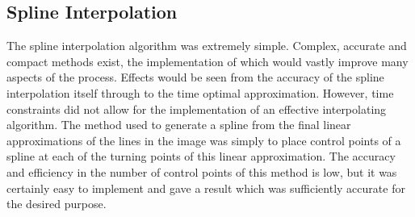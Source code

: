 \subsection{Spline Interpolation}
The spline interpolation algorithm was extremely simple. Complex, accurate and compact methods exist, the implementation of which would vastly improve many aspects of the process. Effects would be seen from the accuracy of the spline interpolation itself through to the time optimal approximation. However, time constraints did not allow for the implementation of an effective interpolating algorithm. The method used to generate a spline from the final linear approximations of the lines in the image was simply to place control points of a spline at each of the turning points of this linear approximation. The accuracy and efficiency in the number of control points of this method is low, but it was certainly easy to implement and gave a result which was sufficiently accurate for the desired purpose.
